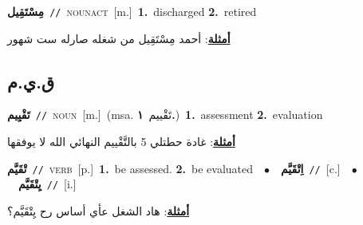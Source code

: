 \documentclass[10pt,a4paper,twoside]{article} %
\begin{document}
\begin{multicols}{2}
{\setlength\topsep{0pt}\textbf{\foreignlanguage{arabic}{مِسْتَقِيل}}\ {\color{gray}\texttt{//}\color{black}}\ \textsc{noun\textunderscore act}\ [m.]\ \textbf{1.}~discharged  \textbf{2.}~retired\  \begin{flushright}\color{gray}\foreignlanguage{arabic}{\textbf{\underline{\foreignlanguage{arabic}{أمثلة}}}: أحمد مِسْتَقِيل من شغله صارله ست شهور}\end{flushright}\color{black}} \vspace{2mm}

\vspace{-3mm}
\subsection*{\color{blue}\foreignlanguage{arabic}{ق.ي.م}\color{blue}{}} 

{\setlength\topsep{0pt}\textbf{\foreignlanguage{arabic}{تَقْيِيم}}\ {\color{gray}\texttt{//}\color{black}}\ \textsc{noun}\ [m.]\ \color{gray}(msa. \foreignlanguage{arabic}{تَقْييم}~\foreignlanguage{arabic}{\textbf{١.}})\color{black}\ \textbf{1.}~assessment  \textbf{2.}~evaluation\  \begin{flushright}\color{gray}\foreignlanguage{arabic}{\textbf{\underline{\foreignlanguage{arabic}{أمثلة}}}: غادة حطتلي 5 بالتَّقْييم النهائي الله لا يوفقها}\end{flushright}\color{black}} \vspace{2mm}

{\setlength\topsep{0pt}\textbf{\foreignlanguage{arabic}{تْقَيَّم}}\ {\color{gray}\texttt{//}\color{black}}\ \textsc{verb}\ [p.]\ \textbf{1.}~be assessed.  \textbf{2.}~be evaluated\ \ $\bullet$\ \ \setlength\topsep{0pt}\textbf{\foreignlanguage{arabic}{اِتْقَيَّم}}\ {\color{gray}\texttt{//}\color{black}}\ [c.]\ \ $\bullet$\ \ \setlength\topsep{0pt}\textbf{\foreignlanguage{arabic}{يِتْقَيَّم}}\ {\color{gray}\texttt{//}\color{black}}\ [i.]\  \begin{flushright}\color{gray}\foreignlanguage{arabic}{\textbf{\underline{\foreignlanguage{arabic}{أمثلة}}}: هاد الشغل عأي أساس رح يِتْقَيَّم؟}\end{flushright}\color{black}} \vspace{2mm}


\end{multicols}
\end{document}
